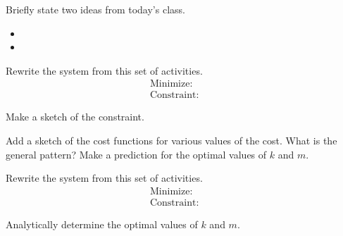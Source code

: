 \begin{problem}
\item Briefly state two ideas from today's class.
  \begin{itemize}
  \item 
  \item 
  \end{itemize}


\item Rewrite the system from this set of activities.
    \begin{eqnarray*}
      \mathrm{Minimize:} & &  \\
      \mathrm{Constraint:} & & 
    \end{eqnarray*}
    \begin{subproblem}
    \item Make a sketch of the constraint.  

      \vfill

    \item Add a sketch of the cost functions for various values of the
      cost. What is the general pattern? Make a prediction for the
      optimal values of $k$ and $m$.

      \vspace{3em}
    \end{subproblem}
\clearpage

\item Rewrite the system from this set of activities.
  \begin{eqnarray*}
    \mathrm{Minimize:} & &  \\
    \mathrm{Constraint:} & & 
  \end{eqnarray*}

  \begin{subproblem}
  \item Analytically determine the optimal values of $k$ and $m$.
    \vfill
  \end{subproblem}
\end{problem}


